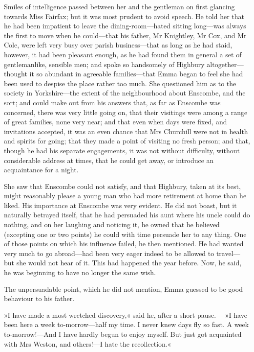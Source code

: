 Smiles of intelligence passed between her and the gentleman on first glancing towards Miss Fairfax; but it was most prudent to avoid speech. He told her that he had been impatient to leave the dining-room—hated sitting long—was always the first to move when he could—that his father, Mr Knightley, Mr Cox, and Mr Cole, were left very busy over parish business—that as long as he had staid, however, it had been pleasant enough, as he had found them in general a set of gentlemanlike, sensible men; and spoke so handsomely of Highbury altogether—thought it so abundant in agreeable families—that Emma began to feel she had been used to despise the place rather too much. She questioned him as to the society in Yorkshire—the extent of the neighbourhood about Enscombe, and the sort; and could make out from his answers that, as far as Enscombe was concerned, there was very little going on, that their visitings were among a range of great families, none very near; and that even when days were fixed, and invitations accepted, it was an even chance that Mrs Churchill were not in health and spirits for going; that they made a point of visiting no fresh person; and that, though he had his separate engagements, it was not without difficulty, without considerable address at times, that he could get away, or introduce an acquaintance for a night.

She saw that Enscombe could not satisfy, and that Highbury, taken at its best, might reasonably please a young man who had more retirement at home than he liked. His importance at Enscombe was very evident. He did not boast, but it naturally betrayed itself, that he had persuaded his aunt where his uncle could do nothing, and on her laughing and noticing it, he owned that he believed (excepting one or two points) he could with time persuade her to any thing. One of those points on which his influence failed, he then mentioned. He had wanted very much to go abroad—had been very eager indeed to be allowed to travel—but she would not hear of it. This had happened the year before. Now, he said, he was beginning to have no longer the same wish.

The unpersuadable point, which he did not mention, Emma guessed to be good behaviour to his father.

»I have made a most wretched discovery,« said he, after a short pause.— »I have been here a week to-morrow—half my time. I never knew days fly so fast. A week to-morrow!—And I have hardly begun to enjoy myself. But just got acquainted with Mrs Weston, and others!—I hate the recollection.«

